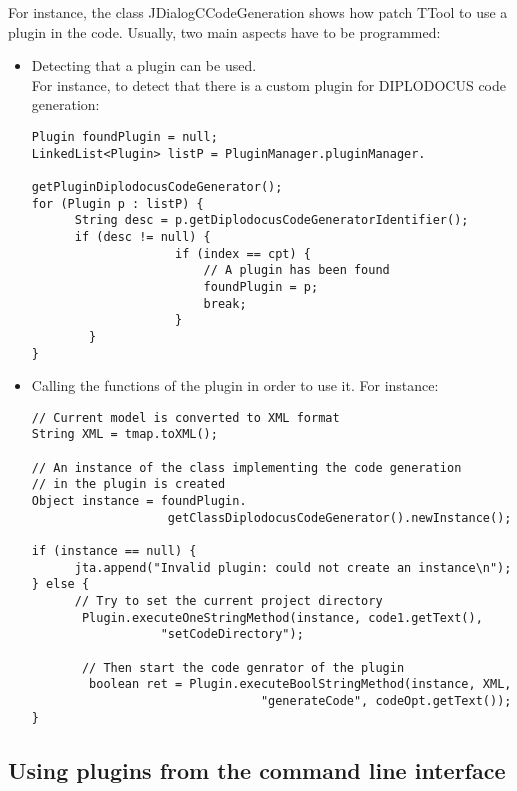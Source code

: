 \documentclass[12pt]{article}
\begin{document}
For instance, the class JDialogCCodeGeneration shows how patch TTool to use a plugin in the code. Usually, two main aspects have to be programmed:
\begin{itemize}
\item Detecting that a plugin can be used.\\
For instance, to detect that there is a custom plugin for DIPLODOCUS code generation:
\begin{lstlisting}
Plugin foundPlugin = null;
LinkedList<Plugin> listP = PluginManager.pluginManager.
                                 getPluginDiplodocusCodeGenerator();
for (Plugin p : listP) {
      String desc = p.getDiplodocusCodeGeneratorIdentifier();
      if (desc != null) {
                    if (index == cpt) {
                        // A plugin has been found
                        foundPlugin = p;
                        break;
                    }
        }
}
\end{lstlisting}

\item Calling the functions of the plugin in order to use it. For instance:
\begin{lstlisting}
// Current model is converted to XML format
String XML = tmap.toXML();

// An instance of the class implementing the code generation 
// in the plugin is created
Object instance = foundPlugin.
                   getClassDiplodocusCodeGenerator().newInstance();

if (instance == null) {
      jta.append("Invalid plugin: could not create an instance\n");
} else {
      // Try to set the current project directory
       Plugin.executeOneStringMethod(instance, code1.getText(), 
                  "setCodeDirectory");

       // Then start the code genrator of the plugin
        boolean ret = Plugin.executeBoolStringMethod(instance, XML, 
                                "generateCode", codeOpt.getText());
}
\end{lstlisting}
\end{itemize}



\subsection{Using plugins from the command line interface}
\end{document}
